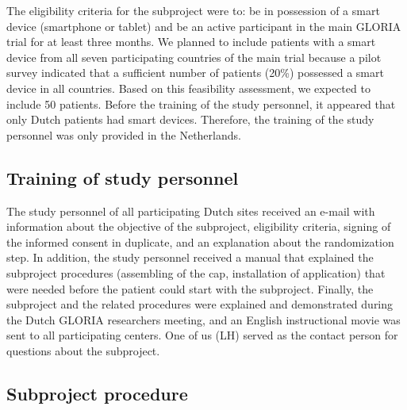 \documentclass[twocolumn, issue, empirical, authordate]{jote-new-article}
\begin{document}
 The eligibility criteria for the subproject were to: be in possession of a smart device (smartphone or tablet) and be an active participant in the main GLORIA trial for at least three months. We planned to include patients with a smart device from all seven participating countries of the main trial because a pilot survey indicated that a sufficient number of patients (20\%) possessed a smart device in all countries. Based on this feasibility assessment, we expected to include 50 patients.
 Before the training of the study personnel, it appeared that only Dutch patients had smart devices. Therefore, the training of the study personnel was only provided in the Netherlands.


\subsection{Training of study personnel}

 The study personnel of all participating Dutch sites received an e-mail with information about the objective of the subproject, eligibility criteria, signing of the informed consent in duplicate, and an explanation about the randomization step. In addition, the study personnel received a manual that explained the subproject procedures (assembling of the cap, installation of application) that were needed before the patient could start with the subproject. Finally, the subproject and the related procedures were explained and demonstrated during the Dutch GLORIA researchers meeting, and an English instructional movie was sent to all participating centers. One of us (LH) served as the contact person for questions about the subproject.


\subsection{Subproject procedure}
\end{document}
